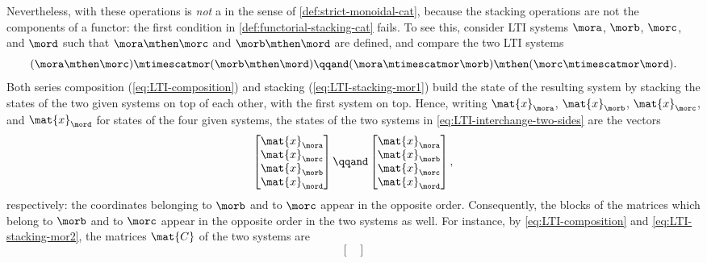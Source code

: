 \begin{example}
    Nevertheless, \LTI with these operations is \emph{not} a  in the sense of \cref{def:strict-monoidal-cat}, because the stacking operations are not the components of a functor: the first condition in \cref{def:functorial-stacking-cat} fails.
    To see this, consider LTI systems $\mora$, $\morb$, $\morc$, and $\mord$ such that $\mora \mthen \morc$ and $\morb \mthen \mord$ are defined, and compare the two LTI systems
    \begin{equation}
        \label{eq:LTI-interchange-two-sides}
        (\mora \mthen \morc) \mtimescatmor (\morb \mthen \mord)
        \qqand
        (\mora \mtimescatmor \morb) \mthen (\morc \mtimescatmor \mord).
    \end{equation}
    Both series composition (\cref{eq:LTI-composition}) and stacking (\cref{eq:LTI-stacking-mor1}) build the state of the resulting system by stacking the states of the two given systems on top of each other, with the first system on top.
    Hence, writing $\mat{x}_\mora$, $\mat{x}_\morb$, $\mat{x}_\morc$, and $\mat{x}_\mord$ for states of the four given systems, the states of the two systems in \cref{eq:LTI-interchange-two-sides} are the vectors
    \begin{equation}
        \label{eq:LTI-interchange-states}
        \begin{bmatrix}
            \mat{x}_\mora \\
            \mat{x}_\morc \\
            \mat{x}_\morb \\
            \mat{x}_\mord
        \end{bmatrix}
        \qqand
        \begin{bmatrix}
            \mat{x}_\mora \\
            \mat{x}_\morb \\
            \mat{x}_\morc \\
            \mat{x}_\mord
        \end{bmatrix},
    \end{equation}
    respectively: the coordinates belonging to $\morb$ and to $\morc$ appear in the opposite order.
    Consequently, the blocks of the matrices which belong to $\morb$ and to $\morc$ appear in the opposite order in the two systems as well.
    For instance, by \cref{eq:LTI-composition} and \cref{eq:LTI-stacking-mor2}, the matrices $\mat{C}$ of the two systems are
    \begin{equation}
        \label{eq:LTI-interchange-C-matrices}
        \begin{bmatrix}

\end{bmatrix}
\end{equation}
\end{example}
